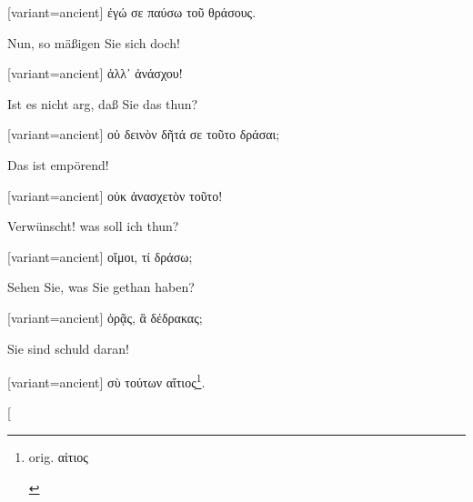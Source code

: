 \switchcolumn

\begin{greek}[variant=ancient]%
ἐγώ σε παύσω τοῦ θράσους.

\end{greek}%
\switchcolumn*

Nun, so mäßigen Sie sich doch! 

\switchcolumn

\begin{greek}[variant=ancient]%
ἀλλ᾽ ἀνάσχου!

\end{greek}%
\switchcolumn*

Ist es nicht arg, daß Sie das thun? 

\switchcolumn

\begin{greek}[variant=ancient]%
οὐ δεινὸν δῆτά σε τοῦτο δράσαι;

\end{greek}%
\switchcolumn*

Das ist empörend! 

\switchcolumn

\begin{greek}[variant=ancient]%
οὐκ ἀνασχετὸν τοῦτο!

\end{greek}%
\switchcolumn*

Verwünscht! was soll ich thun? 

\switchcolumn

\begin{greek}[variant=ancient]%
οἴμοι, τί δράσω;

\end{greek}%
\switchcolumn*

Sehen Sie, was Sie gethan haben? 

\switchcolumn

\begin{greek}[variant=ancient]%
ὁρᾷς, ἃ δέδρακας;

\end{greek}%
\switchcolumn*

Sie sind schuld daran! 

\switchcolumn

\begin{greek}[variant=ancient]%
σὺ τούτων αἴτιος\footnote{\begin{latin}%
orig. \textgreek[variant=ancient]{αἰτιος}\end{latin}%
}.

\end{greek}%
\switchcolumn*[


